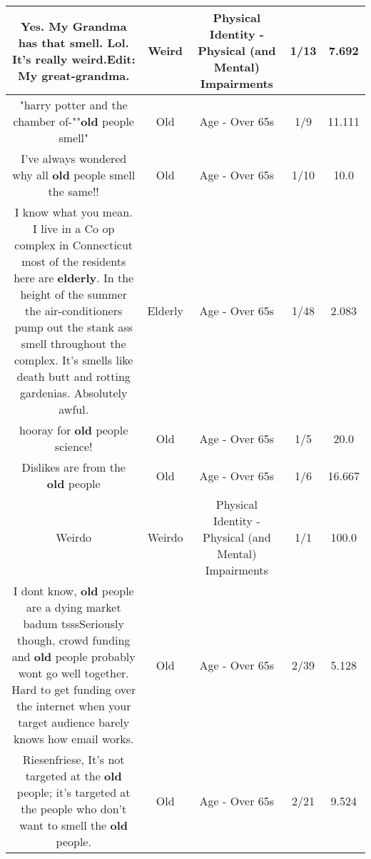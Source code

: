 \documentclass[11pt]{article}
\newlength\mylength
\begin{document}
\begin{center}
\begin{longtable}{|C{.65\mylength}|C{.30\mylength}|C{.12\mylength}|C{.12\mylength}|C{.12\mylength}|}
  \small Yes. My Grandma has that smell. Lol. It's really \textbf{weird}.Edit: My great-grandma.\normalsize   & Weird & Physical Identity - Physical (and Mental) Impairments & 1/13 & 7.692 \\  \hline
  \small "harry potter and the chamber of-""\textbf{old} people smell"\normalsize   & Old & Age - Over 65s & 1/9 & 11.111 \\  \hline
  \small I've always wondered why all \textbf{old} people smell the same!!\normalsize   & Old & Age - Over 65s & 1/10 & 10.0 \\  \hline
  \small I know what you mean. I live in a Co op complex in Connecticut most of the residents here are \textbf{elderly}. In the height of the summer the air-conditioners pump out the stank ass smell throughout the complex. It's smells like death butt and  rotting gardenias. Absolutely awful.\normalsize   & Elderly & Age - Over 65s & 1/48 & 2.083 \\  \hline
  \small hooray for \textbf{old} people science!\normalsize   & Old & Age - Over 65s & 1/5 & 20.0 \\  \hline
  \small Dislikes are from the \textbf{old} people\normalsize   & Old & Age - Over 65s & 1/6 & 16.667 \\  \hline
  \small Weirdo\normalsize   & Weirdo & Physical Identity - Physical (and Mental) Impairments & 1/1 & 100.0 \\  \hline
  \small I dont know, \textbf{old} people are a dying market  badum tsssSeriously though, crowd funding and \textbf{old} people probably wont go well together. Hard to get funding over the internet when your target audience barely knows how email works.\normalsize   & Old & Age - Over 65s & 2/39 & 5.128 \\  \hline
  \small Riesenfriese, It's not targeted at the \textbf{old} people; it's targeted at the people who don't want to smell the \textbf{old} people.\normalsize   & Old & Age - Over 65s & 2/21 & 9.524 \\  \hline

\end{longtable}
\end{center}
\end{document}
